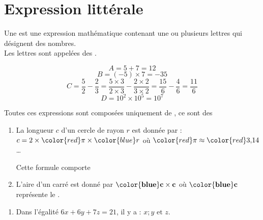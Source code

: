 \section{Expression littérale}
\begin{Definition}
    Une  est une expression mathématique contenant une ou plusieurs lettres qui désignent des nombres.\\

    Les lettres sont appelées des .
\end{Definition}
\begin{Exemple}
    \begin{multicols}{2}
        \[A=5+7=12\]
        \[B=(-5)\times 7=-35\]
        \[C=\dfrac{5}{2}-\dfrac{2}{3}=\dfrac{5\times 3}{2\times 3}- \dfrac{2\times 2}{3\times 2}=\dfrac{15}{6}-\dfrac{4}{6}=\dfrac{11}{6}\]
        \[D=10^{2}\times 10^{5}=10^{7}\]
    
    
    \columnbreak

        Toutes ces expressions sont composées uniquement de , ce sont des 
    \end{multicols}
\end{Exemple}
\begin{Exemple}
    \begin{multicols}{2}
    \begin{enumerate}
        \item La longueur $c$ d’un cercle de rayon $r$ est donnée par : \\
        $c = 2\times {\color{red}\pi} \times \color{blue}r$ 
        où $\color{red}\pi\approx \color{red}3{,}14$…
        \begin{center}
            \figureLongueurCercle
        \end{center}
        Cette formule comporte 
        \columnbreak

        \item L’aire d’un carré est donné par $\mathbf{\color{blue}c\times c}$
        où $\mathbf{\color{blue}c}$ représente le .
        \vspace{-0.8cm}\begin{center}
            \figureAireCarre
        \end{center}
    \end{enumerate}
    
    
    \end{multicols}
    \begin{enumerate}[start=3]
        \item Dans l'égalité $6x+6y+7z=21$, il y a  : $x ; y \text{ et } z$.\\
    \end{enumerate}
    \solEquation
\end{Exemple}
\newpage
